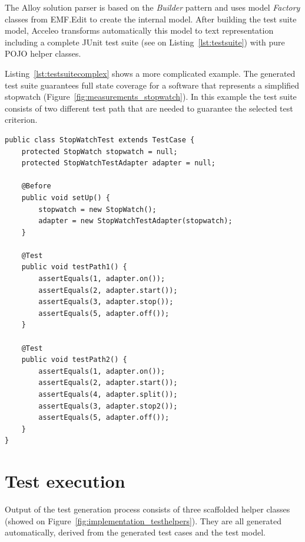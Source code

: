 The Alloy solution parser is based on the \textit{Builder} pattern \cite{designpatterns} and uses model \textit{Factory} classes from EMF.Edit to create the internal model. After building the test suite model, Acceleo transforms automatically this model to text representation including a complete JUnit test suite (see on Listing~\ref{lst:testsuite}) with pure POJO helper classes.

Listing~\ref{lst:testsuitecomplex} shows a more complicated example. The generated test suite guarantees full state coverage for a software that represents a simplified stopwatch (Figure~\ref{fig:measurements_stopwatch}). In this example the test suite consists of two different test path that are needed to guarantee the selected test criterion.

\begin{lstlisting}[label={lst:testsuitecomplex}, caption=Test suite for a stopwatch (Figure~\ref{fig:measurements_stopwatch}),breaklines=true]
public class StopWatchTest extends TestCase {
	protected StopWatch stopwatch = null;
	protected StopWatchTestAdapter adapter = null;
	   
	@Before 
	public void setUp() {
		stopwatch = new StopWatch();
		adapter = new StopWatchTestAdapter(stopwatch);
	}

	@Test
	public void testPath1() {
		assertEquals(1, adapter.on());
		assertEquals(2, adapter.start());
		assertEquals(3, adapter.stop());
		assertEquals(5, adapter.off());
	}

	@Test
	public void testPath2() {
		assertEquals(1, adapter.on());
		assertEquals(2, adapter.start());
		assertEquals(4, adapter.split());
		assertEquals(3, adapter.stop2());
		assertEquals(5, adapter.off());
	}
}
\end{lstlisting}


\section{Test execution}
\label{sec:testexecutionimplementation}

Output of the test generation process consists of three scaffolded helper classes (showed on Figure~\ref{fig:implementation_testhelpers}). They are all generated automatically, derived from the generated test cases and the test model.
	

